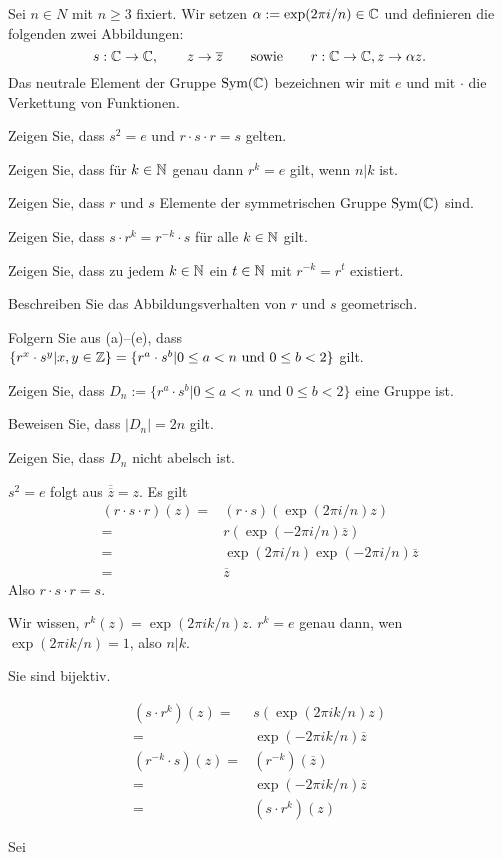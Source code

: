 \begin{Problem}
	Sei $n\in N$ mit $n\ge 3$ fixiert. Wir setzen $\alpha := \exp ( 2\pi i / n ) \in \mathbb{C}$ und definieren die folgenden zwei Abbildungen:
	\[
		s:\mathbb{C}\to \mathbb{C}, \qquad z\to \overline{z}\qquad\text{sowie}\qquad r:\mathbb{C}\to\mathbb{C}, z\to\alpha z
	.\] 
	Das neutrale Element der Gruppe $\text{Sym}(\mathbb{C})$ bezeichnen wir mit $e$ und mit $\cdot$ die Verkettung von Funktionen.
	\begin{parts}
	\item Zeigen Sie, dass $s^2=e$ und $r\cdot s\cdot r=s$ gelten.
	\item Zeigen Sie, dass für $k\in\mathbb{N}$ genau dann $r^k = e$ gilt, wenn $n|k$ ist.
	\item Zeigen Sie, dass $r$ und $s$ Elemente der symmetrischen Gruppe $\text{Sym}(\mathbb{C})$ sind.
	\item Zeigen Sie, dass $s\cdot r^k = r^{-k} \cdot s$ für alle $k \in\mathbb{N}$ gilt.
	\item Zeigen Sie, dass zu jedem $k\in \mathbb{N}$ ein $t\in \mathbb{N}$ mit $r^{-k}=r^t$ existiert.
	\item Beschreiben Sie das Abbildungsverhalten von $r$ und $s$ geometrisch.
	\item Folgern Sie aus (a)–(e), dass $\{r^x \cdot s^y | x, y \in \mathbb{Z}\} = \{r^a \cdot s^b | 0 \le a < n\text{ und }0 \le b < 2\}$ gilt.
	\item Zeigen Sie, dass $D_n := \{r^a \cdot s^b |0 \le a < n\text{ und }0 \le b < 2\}$ eine Gruppe ist.
	\item Beweisen Sie, dass $|D_n| = 2n$ gilt.
	\item Zeigen Sie, dass $D_n$ nicht abelsch ist.
	\end{parts}
\end{Problem}
\begin{parts}
\item  $s^2=e$ folgt aus $\overline{\overline{z}}=z$. Es gilt
\begin{align*}
	(r\cdot s\cdot r)(z)=&(r\cdot s)\left( \exp(2\pi i / n)z \right) \\
	=& r\left( \exp(-2\pi i / n)\overline{z} \right) \\
	=& \exp(2\pi i / n)\exp(-2\pi i / n )\overline{z}\\
	=& \overline{z}
\end{align*}
Also $r\cdot s\cdot r = s$.
\item Wir wissen,  $r^k(z)=\exp(2\pi i k / n)z$. $r^k=e$ genau dann, wen $\exp(2\pi i k / n)=1$, also $n | k$.
\item Sie sind bijektiv.
\item 
	 \begin{align*}
		 (s\cdot r^k)(z)=& s\left( \exp\left( 2\pi i k / n \right) z \right) \\
		 =& \exp\left( -2\pi i k / n \right) \overline{z}\\
		 (r^{-k}\cdot s)(z)=&\left( r^{-k} \right) (\overline{z})\\
		 =& \exp(-2\pi i k / n)\overline{z}\\
		 =&(s\cdot r^k)(z)
	\end{align*}
\item Sei 
\end{parts}
